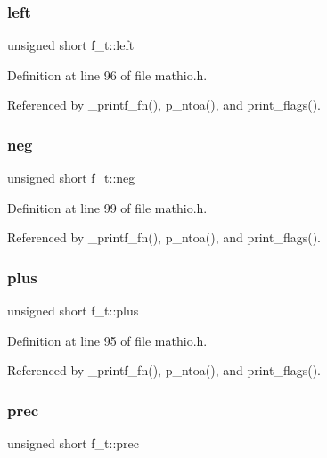 \subsubsection{\texorpdfstring{left}{left}}
{\footnotesize\ttfamily unsigned short f\+\_\+t\+::left}



Definition at line 96 of file mathio.\+h.



Referenced by \+\_\+printf\+\_\+fn(), p\+\_\+ntoa(), and print\+\_\+flags().

\mbox{\label{unionf__t_a08d5e77f0fdb784ab1ef1425625e23f7}} 
\subsubsection{\texorpdfstring{neg}{neg}}
{\footnotesize\ttfamily unsigned short f\+\_\+t\+::neg}



Definition at line 99 of file mathio.\+h.



Referenced by \+\_\+printf\+\_\+fn(), p\+\_\+ntoa(), and print\+\_\+flags().

\mbox{\label{unionf__t_a63ebe04d55417685e439b779dfa8dafe}} 
\subsubsection{\texorpdfstring{plus}{plus}}
{\footnotesize\ttfamily unsigned short f\+\_\+t\+::plus}



Definition at line 95 of file mathio.\+h.



Referenced by \+\_\+printf\+\_\+fn(), p\+\_\+ntoa(), and print\+\_\+flags().

\mbox{\label{unionf__t_afd9cfffafc044b616256b483e5444d92}} 
\subsubsection{\texorpdfstring{prec}{prec}}
{\footnotesize\ttfamily unsigned short f\+\_\+t\+::prec}



